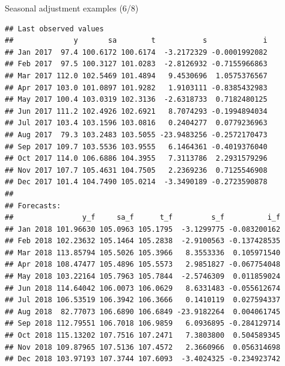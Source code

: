 \documentclass[10pt,xcolor=table,color={dvipsnames,usenames},ignorenonframetext,usepdftitle=false,french]{beamer}
\newenvironment{Shaded}{\begin{snugshade}}{\end{snugshade}}
\newcommand{\NormalTok}[1]{#1}
\newcommand{\OperatorTok}[1]{\textcolor[rgb]{0.81,0.36,0.00}{\textbf{#1}}}
\begin{document}
\begin{frame}[fragile]{Seasonal adjustment examples (6/8)}
\protect\hypertarget{seasonal-adjustment-examples-68}{}

\footnotesize

\begin{Shaded}
\end{Shaded}

\begin{verbatim}
## Last observed values
##              y       sa        t           s             i
## Jan 2017  97.4 100.6172 100.6174  -3.2172329 -0.0001992082
## Feb 2017  97.5 100.3127 101.0283  -2.8126932 -0.7155966863
## Mar 2017 112.0 102.5469 101.4894   9.4530696  1.0575376567
## Apr 2017 103.0 101.0897 101.9282   1.9103111 -0.8385432983
## May 2017 100.4 103.0319 102.3136  -2.6318733  0.7182480125
## Jun 2017 111.2 102.4926 102.6921   8.7074293 -0.1994894034
## Jul 2017 103.4 103.1596 103.0816   0.2404277  0.0779236963
## Aug 2017  79.3 103.2483 103.5055 -23.9483256 -0.2572170473
## Sep 2017 109.7 103.5536 103.9555   6.1464361 -0.4019376040
## Oct 2017 114.0 106.6886 104.3955   7.3113786  2.2931579296
## Nov 2017 107.7 105.4631 104.7505   2.2369236  0.7125546908
## Dec 2017 101.4 104.7490 105.0214  -3.3490189 -0.2723590878
## 
## Forecasts:
##                y_f     sa_f      t_f         s_f          i_f
## Jan 2018 101.96630 105.0963 105.1795  -3.1299775 -0.083200162
## Feb 2018 102.23632 105.1464 105.2838  -2.9100563 -0.137428535
## Mar 2018 113.85794 105.5026 105.3966   8.3553336  0.105971540
## Apr 2018 108.47477 105.4896 105.5573   2.9851827 -0.067754048
## May 2018 103.22164 105.7963 105.7844  -2.5746309  0.011859024
## Jun 2018 114.64042 106.0073 106.0629   8.6331483 -0.055612674
## Jul 2018 106.53519 106.3942 106.3666   0.1410119  0.027594337
## Aug 2018  82.77073 106.6890 106.6849 -23.9182264  0.004061745
## Sep 2018 112.79551 106.7018 106.9859   6.0936895 -0.284129714
## Oct 2018 115.13202 107.7516 107.2471   7.3803800  0.504589345
## Nov 2018 109.87965 107.5136 107.4572   2.3660966  0.056314698
## Dec 2018 103.97193 107.3744 107.6093  -3.4024325 -0.234923742
\end{verbatim}

\end{frame}
\end{document}
